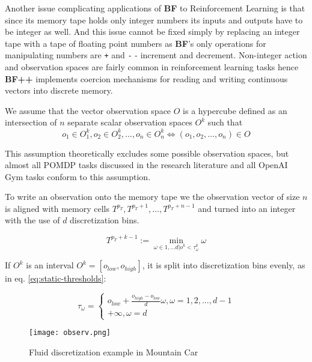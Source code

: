 Another issue complicating applications of \textbf{BF} to Reinforcement Learning is that since its memory tape holds only integer numbers its inputs and outputs have to be integer as well.
And this issue cannot be fixed simply by replacing an integer tape with a tape of floating point numbers as \textbf{BF}'s only operations for manipulating numbers are \texttt{+} and \texttt{-} - increment and decrement.
Non-integer action and observation spaces are fairly common in reinforcement learning tasks hence \textbf{BF++} implements coercion mechanisms for reading and writing continuous vectors into discrete memory.

We assume that the vector observation space $O$ is a hypercube defined as an intersection of $n$ separate scalar observation spaces $O^k$ such that 
\begin{equation}
 o_1 \in O_1^k,o_2 \in O_2^k,\dots,o_n \in O_n^k \Leftrightarrow (o_1,o_2,\dots,o_n) \in O  
\end{equation}

This assumption theoretically excludes some possible observation spaces, but almost all POMDP tasks discussed in the research literature and all OpenAI Gym tasks conform to this assumption.

To write an observation onto the memory tape we the observation vector of size $n$ is aligned with memory cells $T^{p_T},T^{p_T+1},\dots,T^{p_T+n-1}$ and turned into an integer with the use of $d$ discretization bins.

\begin{equation}
\label{eq:discretization}
T^{p_T+k-1} := \min_{\omega \in 1,\dots d | o^k < \tau^k_\omega} \omega
\end{equation}

If $O^k$ is an interval $O^k=[o_{low}, o_{high}]$, it is split into discretization bins evenly, as in eq. \ref{eq:static-thresholds}:

\begin{equation}
\label{eq:static-thresholds}
\tau_\omega = \begin{cases}
o_{low}+\frac{o_{high}-o_{low}}{d}\omega, \omega=1,2,\dots,d-1 \\
+\infty, \omega=d 
\end{cases}
\end{equation}

\begin{figure}[htb]
    \centering
    \texttt{[image: observ.png]}
    \caption{Fluid discretization example in Mountain Car}
    \label{fig:obs}
\end{figure}

